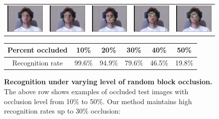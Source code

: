 \documentclass[10pt,journal,letterpaper,compsoc]{IEEEtran} %
\begin{document}
\newcommand{\tempscale}{0.40}
\begin{figure}
\centering
\begin{tabular}{@{}c@{}c@{}c@{}c@{}c@{}}
\includegraphics[scale=\tempscale,clip=true]{figures_pami/multipie_occ/occ10.png} &
\includegraphics[scale=\tempscale,clip=true]{figures_pami/multipie_occ/occ20.png} &
\includegraphics[scale=\tempscale,clip=true]{figures_pami/multipie_occ/occ30.png} &
\includegraphics[scale=\tempscale,clip=true]{figures_pami/multipie_occ/occ40.png} &
\includegraphics[scale=\tempscale,clip=true]{figures_pami/multipie_occ/occ50.png}  \\
\end{tabular}
\vspace{-1mm}
\caption{{\bf Recognition under varying level of
random block occlusion.} The above row shows examples of occluded test images with occlusion level from 10\% to 50\%. Our method maintains high recognition rates up to 30\% occlusion:}
\vspace{2mm}
{\small
\begin{tabular}{|c|c|c|c|c|c| }
\hline
Percent occluded & 10\% & 20\% & 30\% & 40\% & 50\%  \\
\hline
Recognition rate & 99.6\% & 94.9\% & 79.6\% & 46.5\% & 19.8\% \\
\hline
\end{tabular}
}
\label{fig:multipie-occ-rec}
\vspace{-.5in}
\end{figure}
\end{document}
